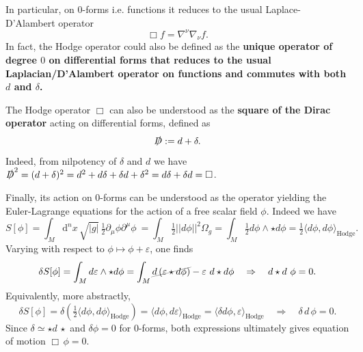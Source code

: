 \documentclass[../geometry_main.tex]{subfiles}
\begin{document}
\begin{mytheorem}
In particular, on 0-forms i.e. functions it reduces to the usual Laplace-D'Alambert operator
\begin{equation}
    \Box f =  \nabla^{\nu} \nabla_{\nu} f.
\end{equation}
In fact, the Hodge operator could also  be defined as the \textbf{unique operator of degree $0$ on differential forms that reduces to the usual Laplacian/D'Alambert operator on functions and commutes with both \(d\) and \(\delta\).}
\medskip

The Hodge operator $\Box$ can also be understood as the \textbf{square of the Dirac operator} acting on differential forms, defined as
\begin{equation}
    \slashed{D} := d + \delta.
\end{equation}
Indeed, from nilpotency of $\delta$ and $d$ we have $\slashed{D}^2 = (d + \delta)^2 = d^2 + d \delta + \delta d + \delta^2 = d \delta + \delta d = \Box$.

Finally, its action on 0-forms can be understood as the operator yielding the Euler-Lagrange equations for the action of a free scalar field \(\phi\).
Indeed we have 
\begin{equation}
    S[\phi] =  \int_M\!\! \mathrm{d}^n x\, \sqrt{|g|}\,\tfrac{1}{2} \partial_\mu \phi \partial^\mu \phi\
    = \int_M \tfrac{1}{2}  ||d\phi||^2 \Omega_g = \int_M \tfrac{1}{2} d\phi \wedge \star d\phi 
    = \tfrac{1}{2}\langle d\phi, d\phi \rangle_{\mathrm{Hodge}}.
\end{equation}
Varying with respect to \(\phi\mapsto \phi +\varepsilon\), one finds
\begin{equation}
    \delta S[\phi] = \int_M d \varepsilon \wedge \star d\phi = \int_M \graycancel{d\left(\varepsilon \star d\phi\right)} - \varepsilon\,\, d \star d\phi \quad \Rightarrow \quad d \star d\,\,\phi  = 0.
\end{equation}
Equivalently, more abstractly,
\begin{equation}
    \delta S[\phi] = \delta \left(\tfrac{1}{2}\langle d\phi, d\phi \rangle_{\mathrm{Hodge}}\right)
    = \langle d \phi, d \varepsilon \rangle_{\mathrm{Hodge}}
    = \langle \delta d \phi, \varepsilon \rangle_{\mathrm{Hodge}} \quad \Rightarrow \quad \delta\, d\, \phi = 0.
\end{equation}
Since $\delta \simeq \star d\,\star$ and $\delta \phi=0$ for 0-forms, both expressions ultimately gives equation of motion  $\Box\, \phi = 0$.
%
\end{mytheorem}


\end{document}
